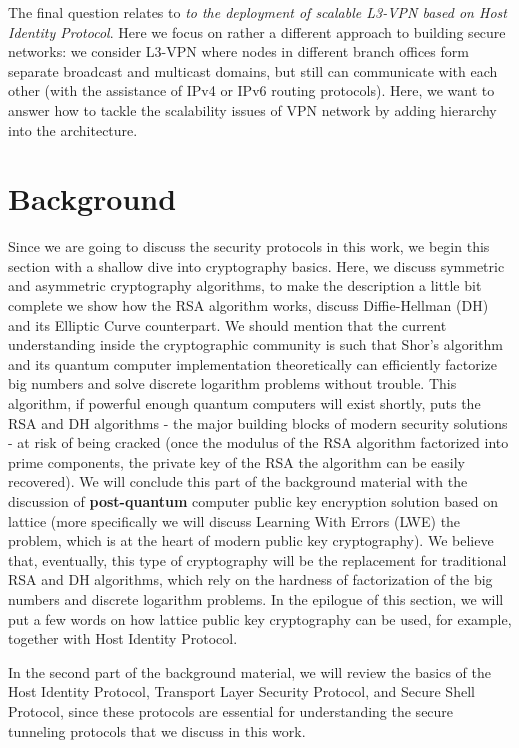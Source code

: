 The final question relates to {\it to the deployment of scalable L3-VPN 
based on Host Identity Protocol}. Here we focus on rather a different approach to building 
secure networks: we consider L3-VPN where nodes in different branch offices form separate 
broadcast and multicast domains, but still can communicate with each other (with the assistance of IPv4 or IPv6 
routing protocols). Here, we want to answer how to tackle the scalability issues of 
VPN network by adding hierarchy into the architecture.


\chapter{Background}

Since we are going to discuss the security protocols in this work, we begin 
this section with a shallow dive into cryptography basics. Here, we discuss 
symmetric and asymmetric cryptography algorithms, to make the description a 
little bit complete we show how the RSA algorithm works, discuss  
Diffie-Hellman (DH) and its Elliptic Curve counterpart. We should mention that the current 
understanding inside the cryptographic community is such that Shor’s algorithm and 
its quantum computer implementation theoretically 
can efficiently factorize big numbers and solve discrete logarithm problems without trouble. 
This algorithm, if powerful enough quantum computers will exist shortly, 
puts the RSA and DH algorithms - the major building blocks of modern security 
solutions - at risk of being cracked (once the modulus of the RSA algorithm factorized 
into prime components, the private key of the RSA 
the algorithm can be easily recovered). We will conclude this part of the background 
material with the discussion of {\bf post-quantum} computer public key encryption 
solution based on lattice (more specifically we will discuss Learning With Errors 
(LWE) the problem, which is at the heart of modern public key cryptography). 
We believe that, eventually, this type of cryptography will be 
the replacement for traditional RSA and DH algorithms, which rely on the hardness 
of factorization of the big numbers and discrete logarithm problems. In the epilogue of this 
section, we will put a few words on how lattice public key cryptography can be used, 
for example, together with Host Identity Protocol.

In the second part of the background material, we will review the basics of the Host 
Identity Protocol, Transport Layer Security Protocol, and Secure Shell Protocol, since 
these protocols are essential for understanding the secure tunneling protocols that we
discuss in this work.

